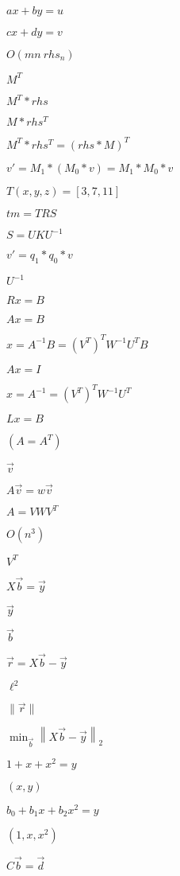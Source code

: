 \documentclass{article}
\begin{document}
$ ax + by = u $
\pagebreak

$ cx + dy = v $
\pagebreak

$ O(m n\ rhs_n) $
\pagebreak

$ M^T $
\pagebreak

$ M^T * rhs $
\pagebreak

$ M * rhs^T $
\pagebreak

$ M^T * rhs^T = (rhs*M)^T $
\pagebreak

$ v' = M_1*(M_0*v) = M_1*M_0*v $
\pagebreak

$ T(x,y,z) = [3,7,11] $
\pagebreak

$ tm = T R S $
\pagebreak

$ S = U K U^{-1} $
\pagebreak

$ v' = q_1*q_0*v $
\pagebreak

$U^{-1}$
\pagebreak

$ Rx = B$
\pagebreak

$ Ax = B $
\pagebreak

$ x = A^{-1} B = (V^T)^T W^{-1} U^T B $
\pagebreak

$ Ax = I $
\pagebreak

$ x = A^{-1} = (V^T)^T W^{-1} U^T $
\pagebreak

$ Lx = B $
\pagebreak

$(A = A^T)$
\pagebreak

$\vec{v}$
\pagebreak

$ A \vec{v} = w \vec{v} $
\pagebreak

$ A = V W V^T $
\pagebreak

$ O(n^3) $
\pagebreak

$ V^T $
\pagebreak

$ X \vec{b} = \vec{y} $
\pagebreak

$\vec{y}$
\pagebreak

$\vec{b}$
\pagebreak

$ \vec{r} = X \vec{b} - \vec{y} $
\pagebreak

$\ell^2$
\pagebreak

$ \| \vec{r} \| $
\pagebreak

$\displaystyle \min_{\vec{b}} \left\| X \vec{b} - \vec{y} \right\|_2 $
\pagebreak

$ 1 + x + x^2 = y $
\pagebreak

$(x,y)$
\pagebreak

$ b_0 + b_1 x + b_2 x^2 = y $
\pagebreak

$(1,x,x^2)$
\pagebreak

$ C \vec{b} = \vec{d} $
\pagebreak
\end{document}
